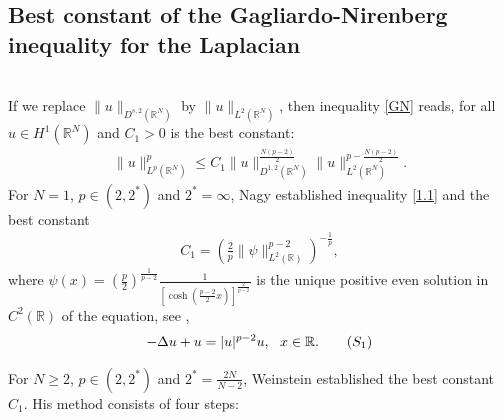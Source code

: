 \documentclass[12pt,a4paper,reqno]{amsart}
\numberwithin{equation}{section}
\begin{document}
\subsection{Best constant of the Gagliardo-Nirenberg inequality for the Laplacian}

$~$\\
If we replace $\|u\|_{D^{s,2}(\mathbb{R}^{N})}$ by $\|u\|_{L^{2}(\mathbb{R}^{N})}$, then inequality \eqref{GN} reads, for all $u\in H^{1}(\mathbb{R}^{N})$ and $C_{1}>0$ is the best constant:
\begin{equation}\label{1.1}
\begin{aligned}
\|u\|_{L^{p}(\mathbb{R}^{N})}^{p}
\leqslant
C_{1}
\|u\|_{D^{1,2}(\mathbb{R}^{N})}^{\frac{N(p-2)}{2}}
\|u\|_{L^{2}(\mathbb{R}^{N})}^{p-\frac{N(p-2)}{2}}.
\end{aligned}
\end{equation}
For $N=1$, $p\in(2,2^{*})$ and $2^{*}=\infty$, Nagy \cite{Nagy1941} established inequality \eqref{1.1} and the best constant
\begin{equation*}
\begin{aligned}
C_{1}=
\left(\frac{2}{p}\|\psi\|_{L^{2}(\mathbb{R})}^{p-2}\right)^{-\frac{1}{p}},
\end{aligned}
\end{equation*}
where
$\psi(x)=\left(\frac{p}{2}\right)^{\frac{1}{p-2}}
\frac{1}{[\cosh(\frac{p-2}{2}x)]^{\frac{2}{p-2}}}$ is the unique positive even solution in $C^{2}(\mathbb{R})$ of the equation, see \cite[Proposition 5.13]{Frank-Lenzmann2013Acta},
\begin{equation}\label{S1}
\begin{aligned}
-\Delta u+u =|u|^{p-2}u, \ \ x\in\mathbb{R}.
\end{aligned}
\tag{$S_{1}$}
\end{equation}


For $N\geqslant2$, $p\in(2,2^{*})$ and $2^{*}=\frac{2N}{N-2}$,
Weinstein \cite[Theorem B]{Weinstein1983CMP} established the best constant $C_{1}$. His method consists of four steps:
\end{document}
